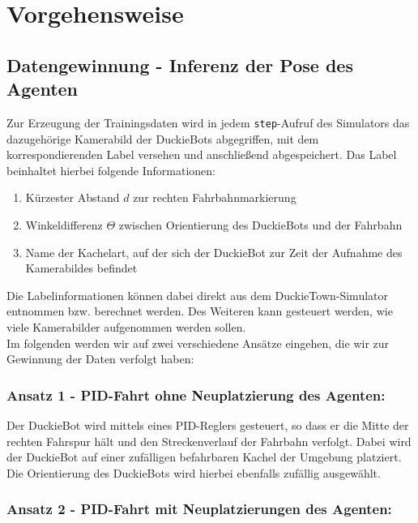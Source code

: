 
\chapter{Vorgehensweise}

\section{Datengewinnung - Inferenz der Pose des Agenten}
\label{collect-data}

Zur Erzeugung der Trainingsdaten wird in jedem \texttt{step}-Aufruf des Simulators das dazugehörige Kamerabild der DuckieBots abgegriffen, mit dem korrespondierenden Label versehen und anschließend abgespeichert. Das Label beinhaltet hierbei folgende Informationen:

\begin{enumerate}
	\item Kürzester Abstand $d$ zur rechten Fahrbahnmarkierung
	\item Winkeldifferenz $\Theta$ zwischen Orientierung des DuckieBots und der Fahrbahn
	\item Name der Kachelart, auf der sich der DuckieBot zur Zeit der Aufnahme des Kamerabildes befindet
\end{enumerate}

Die Labelinformationen können dabei direkt aus dem DuckieTown-Simulator entnommen bzw. berechnet werden. Des Weiteren kann gesteuert werden, wie viele Kamerabilder aufgenommen werden sollen. \\
Im folgenden werden wir auf zwei verschiedene Ansätze eingehen, die wir zur Gewinnung der Daten verfolgt haben:

\subsection{Ansatz 1 - PID-Fahrt ohne Neuplatzierung des Agenten:}

Der DuckieBot wird mittels eines PID-Reglers gesteuert, so dass er die Mitte der rechten Fahrspur hält und den Streckenverlauf der Fahrbahn verfolgt. Dabei wird der DuckieBot auf einer zufälligen befahrbaren Kachel der Umgebung platziert. Die Orientierung des DuckieBots  wird hierbei ebenfalls zufällig ausgewählt.

\subsection{Ansatz 2 - PID-Fahrt mit Neuplatzierungen des Agenten:}

